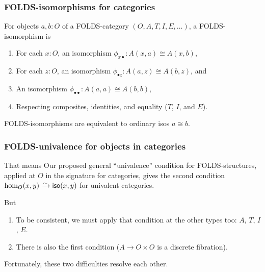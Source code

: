 \documentclass{beamer}
\begin{document}
\begin{frame}[t]
  \frametitle{FOLDS-isomorphisms for categories}
  \begin{example}
    For objects $a,b:O$ of a FOLDS-category $(O,A,T,I,E,\dots)$, a FOLDS-isomorphism is
    \begin{enumerate}
    \item For each $x:O$, an isomorphism $\phi_{x\bullet} : A(x,a) \cong A(x,b)$,
    \item For each $z:O$, an isomorphism $\phi_{\bullet z} : A(a,z) \cong A(b,z)$, and
    \item An isomorphism $\phi_{\bullet\bullet} : A(a,a) \cong A(b,b)$,
    \item Respecting composites, identities, and equality ($T$, $I$, and $E$).
    \end{enumerate}
  \end{example}
  \begin{theorem}
    FOLDS-isomorphisms are equivalent to ordinary isos $a\cong b$.
  \end{theorem}
\end{frame}

\begin{frame}
  \frametitle{FOLDS-univalence for objects in categories}
  \begin{block}{That means}
    Our proposed general ``univalence'' condition for FOLDS-structures, applied at $O$ in the signature for categories, gives the second condition $\hom_O(x,y) \toiso \mathsf{iso}(x,y)$ for univalent categories.
  \end{block}
  \begin{block}{But}
    \begin{enumerate}
    \item To be consistent, we must apply that condition at the other types too: $A$, $T$, $I$, $E$.
    \item There is also the first condition ($A\to O\times O$ is a discrete fibration).
    \end{enumerate}
  \end{block}
  Fortunately, these two difficulties resolve each other.
\end{frame}
\end{document}
